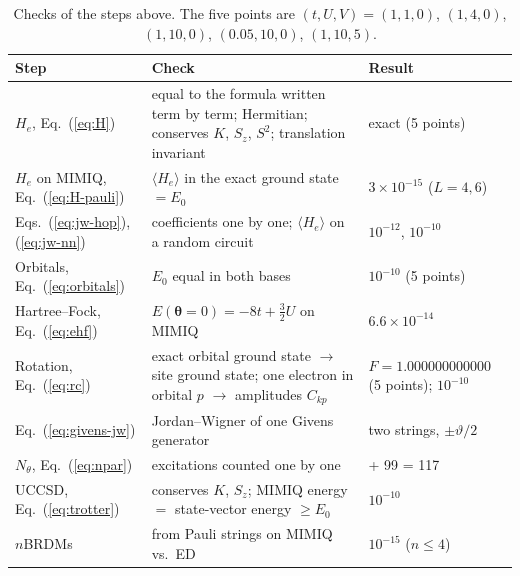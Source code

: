 \documentclass[11pt,a4paper]{article}
\begin{document}
\begin{table}[!h]
\centering
\small
\begin{tabular}{>{\raggedright\arraybackslash}p{3.5cm}>{\raggedright\arraybackslash}p{6.3cm}>{\raggedright\arraybackslash}p{4.3cm}}
  \toprule
  Step & Check & Result \\
  \midrule
  $H_e$, Eq.~(\ref{eq:H}) & equal to the formula written term by term; Hermitian; conserves $K$, $S_z$, $S^2$; translation invariant & exact (5 points) \\
  $H_e$ on MIMIQ, Eq.~(\ref{eq:H-pauli}) & $\langle H_e\rangle$ in the exact ground state $= E_0$ & $3\times10^{-15}$ ($L = 4, 6$) \\
  Eqs.~(\ref{eq:jw-hop}), (\ref{eq:jw-nn}) & coefficients one by one; $\langle H_e\rangle$ on a random circuit & $10^{-12}$, $10^{-10}$ \\
  Orbitals, Eq.~(\ref{eq:orbitals}) & $E_0$ equal in both bases & $10^{-10}$ (5 points) \\
  Hartree--Fock, Eq.~(\ref{eq:ehf}) & $E(\boldsymbol\theta = 0) = -8t + \tfrac32 U$ on MIMIQ & $6.6\times10^{-14}$ \\
  Rotation, Eq.~(\ref{eq:rc}) & exact orbital ground state $\to$ site ground state; one electron in orbital $p$ $\to$ amplitudes $C_{kp}$ & $F = 1.000000000000$ (5 points); $10^{-10}$ \\
  Eq.~(\ref{eq:givens-jw}) & Jordan--Wigner of one Givens generator & two strings, $\pm\vartheta/2$ \\
  $N_\theta$, Eq.~(\ref{eq:npar}) & excitations counted one by one & 18 + 99 = 117 \\
  UCCSD, Eq.~(\ref{eq:trotter}) & conserves $K$, $S_z$; MIMIQ energy $=$ state-vector energy $\ge E_0$ & $10^{-10}$ \\
  $n$BRDMs & from Pauli strings on MIMIQ vs.\ ED & $10^{-15}$ ($n \le 4$) \\
  \bottomrule
\end{tabular}
\caption{Checks of the steps above. The five points are
$(t,U,V) = (1,1,0)$, $(1,4,0)$, $(1,10,0)$, $(0.05,10,0)$, $(1,10,5)$.}
\end{table}
\end{document}

